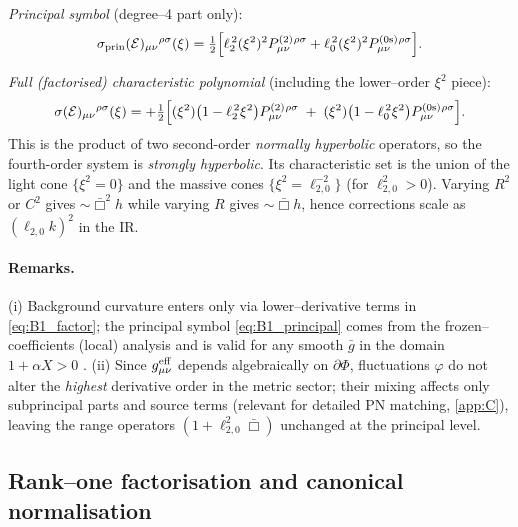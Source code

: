 \documentclass{iopjournal}
\begin{document}
\emph{Principal symbol} (degree–4 part only):
\begin{equation}
\sigma_{\mathrm{prin}}(\mathcal{E})_{\mu\nu}{}^{\rho\sigma}(\xi)
=\tfrac12\Big[\ell_2^{\,2}(\xi^2)^2 P^{(2)}_{\mu\nu}{}^{\rho\sigma}
+\ell_0^{\,2}(\xi^2)^2 P^{(0{\rm s})}_{\mu\nu}{}^{\rho\sigma}\Big].
\label{eq:B1_principal}
\end{equation}

\emph{Full (factorised) characteristic polynomial} (including the lower–order $\xi^2$ piece):
\begin{equation}
\sigma(\mathcal{E})_{\mu\nu}{}^{\rho\sigma}(\xi)
=
+\tfrac12\Big[(\xi^2)\big(1-\ell_2^{\,2}\xi^2\big)P^{(2)}_{\mu\nu}{}^{\rho\sigma}
\;+\;
(\xi^2)\big(1-\ell_0^{\,2}\xi^2\big)P^{(0{\rm s})}_{\mu\nu}{}^{\rho\sigma}\Big].
\label{eq:B1_symbol}
\end{equation}
This is the product of two second-order \emph{normally hyperbolic} operators, so the fourth-order system is \emph{strongly hyperbolic}. Its characteristic set is the union of the light cone $\{\xi^2=0\}$ and the massive cones $\{\xi^2=\ell_{2,0}^{-2}\}$ (for $\ell_{2,0}^2>0$). Varying $R^2$ or $C^2$ gives $\sim \bar\Box^2 h$ while varying $R$ gives $\sim \bar\Box h$, hence corrections scale as $(\ell_{2,0}k)^2$ in the IR.

\paragraph{Remarks.}
(i) Background curvature enters only via lower–derivative terms in \eqref{eq:B1_factor}; the principal symbol \eqref{eq:B1_principal} comes from the frozen–coefficients (local) analysis and is valid for any smooth $\bar g$ in the domain $1+\alpha X>0$ \cite{BGV2007}.
(ii) Since $g^{\rm eff}_{\mu\nu}$ depends algebraically on $\partial\Phi$, fluctuations $\varphi$ do not alter the \emph{highest} derivative order in the metric sector; their mixing affects only subprincipal parts and source terms (relevant for detailed PN matching, \cref{app:C}), leaving the range operators $(1+\ell_{2,0}^2\bar\Box)$ unchanged at the principal level.


\subsection{Rank–one factorisation and canonical normalisation}\label{app:B2}
\end{document}
